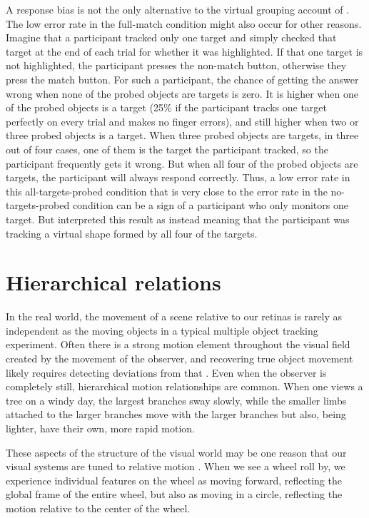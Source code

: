 \documentclass[
]{book}
\begin{document}
A response bias is not the only alternative to the virtual grouping account of \citet{merkelSpatiotemporalPatternsBrain2014}. The low error rate in the full-match condition might also occur for other reasons. Imagine that a participant tracked only one target and simply checked that target at the end of each trial for whether it was highlighted. If that one target is not highlighted, the participant presses the non-match button, otherwise they press the match button. For such a participant, the chance of getting the answer wrong when none of the probed objects are targets is zero. It is higher when one of the probed objects is a target (25\% if the participant tracks one target perfectly on every trial and makes no finger errors), and still higher when two or three probed objects is a target. When three probed objects are targets, in three out of four cases, one of them is the target the participant tracked, so the participant frequently gets it wrong. But when all four of the probed objects are targets, the participant will always respond correctly. Thus, a low error rate in this all-targets-probed condition that is very close to the error rate in the no-targets-probed condition can be a sign of a participant who only monitors one target. But \citet{merkelSpatiotemporalPatternsBrain2014} interpreted this result as instead meaning that the participant was tracking a virtual shape formed by all four of the targets.

\hypertarget{hierarchical-relations}{%
\section{Hierarchical relations}\label{hierarchical-relations}}

In the real world, the movement of a scene relative to our retinas is rarely as independent as the moving objects in a typical multiple object tracking experiment. Often there is a strong motion element throughout the visual field created by the movement of the observer, and recovering true object movement likely requires detecting deviations from that \citep{warrenPerceptionObjectTrajectory2007}. Even when the observer is completely still, hierarchical motion relationships are common. When one views a tree on a windy day, the largest branches sway slowly, while the smaller limbs attached to the larger branches move with the larger branches but also, being lighter, have their own, more rapid motion.

These aspects of the structure of the visual world may be one reason that our visual systems are tuned to relative motion \citep{tadinWhatConstitutesEfficient2002, maruyaRapidEncodingRelationships2013}. When we see a wheel roll by, we experience individual features on the wheel as moving forward, reflecting the global frame of the entire wheel, but also as moving in a circle, reflecting the motion relative to the center of the wheel.
\end{document}
